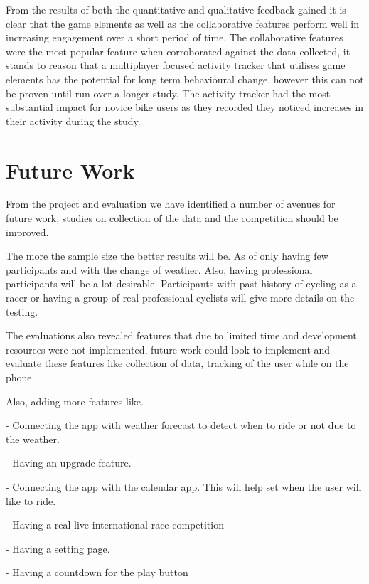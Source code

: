 \documentclass{l4proj}
\begin{document}
From the results of both the quantitative and qualitative feedback gained it is clear that the game elements as well as the collaborative features perform well in increasing engagement over a short period of time. The collaborative features were the most popular feature when corroborated against the data collected, it stands to reason that a multiplayer focused activity tracker that utilises game elements has the potential for long term behavioural change, however this can not be proven until run over a longer study. The activity tracker had the most substantial impact for novice bike users as they recorded they noticed increases in their activity during the study. 


\section{Future Work}


From the project and evaluation we have identified a number of avenues for future work, studies on collection of the data and the competition should be improved.

The more the sample size the better results will be. As of only having few participants and with the change of weather. Also, having professional participants will be a lot desirable. Participants  with past history of cycling as a racer or having a group of real professional cyclists will give more details on the testing. 

The evaluations also revealed features that due to limited time and development resources were not implemented, future work could look to implement and evaluate these features like collection of data, tracking of the user while on the phone. 

Also, adding more features like. 


- Connecting the app with weather forecast to detect when to ride or not due to the weather.


- Having an upgrade feature.


- Connecting the app with the calendar app. This will help set when the user will like to ride.


- Having a real live international race competition 


- Having a setting page.

- Having a countdown for the play button
\end{document}
